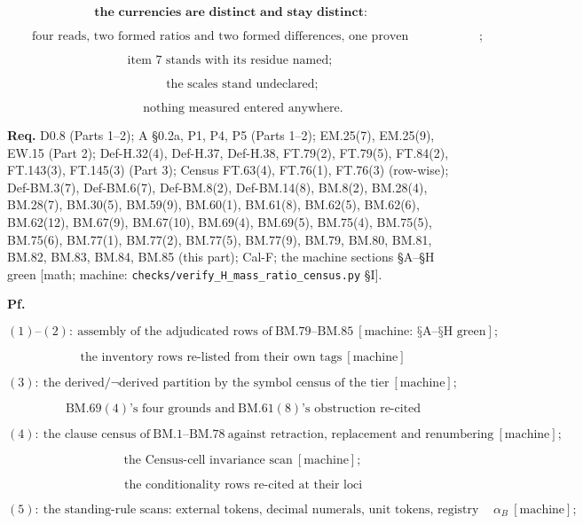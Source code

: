 \documentclass[11pt,openany]{report}
\theoremstyle{canonplain}
\theoremstyle{canondef}
\begin{document}
\[
\textbf{the currencies are distinct and stay distinct:}
\]

\[
\qquad \text{four reads, two formed ratios and two formed differences, one proven incommensurability, one localization, zero conversions};
\]

\[
\text{item 7 stands with its residue named};
\]

\[
\qquad \text{the scales stand undeclared};
\]

\[
\qquad \text{nothing measured entered anywhere}.
\]

\textbf{Req.} D0.8 (Parts 1–2); A §0.2a, P1, P4, P5 (Parts 1–2); EM.25(7), EM.25(9), EW.15 (Part 2); Def-H.32(4), Def-H.37, Def-H.38, FT.79(2), FT.79(5), FT.84(2), FT.143(3), FT.145(3) (Part 3); Census FT.63(4), FT.76(1), FT.76(3) (row-wise); Def-BM.3(7), Def-BM.6(7), Def-BM.8(2), Def-BM.14(8), BM.8(2), BM.28(4), BM.28(7), BM.30(5), BM.59(9), BM.60(1), BM.61(8), BM.62(5), BM.62(6), BM.62(12), BM.67(9), BM.67(10), BM.69(4), BM.69(5), BM.75(4), BM.75(5), BM.75(6), BM.77(1), BM.77(2), BM.77(5), BM.77(9), BM.79, BM.80, BM.81, BM.82, BM.83, BM.84, BM.85 (this part); Cal-F; the machine sections §A–§H green [math; machine: \texttt{checks/\allowbreak{}verify\_\allowbreak{}H\_\allowbreak{}mass\_\allowbreak{}ratio\_\allowbreak{}census.py} §I].

\textbf{Pf.}

\[
(1)\text{--}(2):\ \text{assembly of the adjudicated rows of}\ \mathrm{BM.79}\text{--}\mathrm{BM.85}\ [\text{machine: §A--§H green}];
\]

\[
\qquad \text{the inventory rows re-listed from their own tags}\ [\text{machine}]
\]

\[
(3):\ \text{the derived/}\neg\text{derived partition by the symbol census of the tier}\ [\text{machine}];
\]

\[
\qquad \mathrm{BM.69}(4)\text{'s four grounds and}\ \mathrm{BM.61}(8)\text{'s obstruction re-cited}
\]

\[
(4):\ \text{the clause census of}\ \mathrm{BM.1}\text{--}\mathrm{BM.78}\ \text{against retraction, replacement and renumbering}\ [\text{machine}];
\]

\[
\qquad \text{the Census-cell invariance scan}\ [\text{machine}];
\]

\[
\qquad \text{the conditionality rows re-cited at their loci}
\]

\[
(5):\ \text{the standing-rule scans: external tokens, decimal numerals, unit tokens, registry tokens, declaration lines, the barred object}\ \alpha_B\ [\text{machine}];
\]
\end{document}
